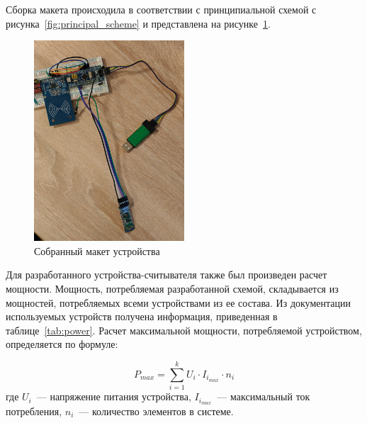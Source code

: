 Сборка макета происходила в соответствии с принципиальной схемой с рисунка~\ref{fig:principal_scheme} и представлена на рисунке~\ref{fig:maket}.

\begin{figure}[H]
    \centering
    \includegraphics[width=0.5\textwidth]{images/design/maket}
    \caption{\centering Собранный макет устройства}
    \label{fig:maket}
\end{figure}

Для разработанного устройства-считывателя также был произведен расчет мощности.
Мощность, потребляемая разработанной схемой, складывается из мощностей, потребляемых всеми устройствами из ее состава.
Из документации используемых устройств получена информация, приведенная в таблице~\ref{tab:power}.
Расчет максимальной мощности, потребляемой устройством, определяется по формуле:

$$
P_{max} = \sum_{i=1}^{k} U_i \cdot I_{i_{max}} \cdot n_i
$$
где $U_i$~--- напряжение питания устройства, $I_{i_{max}}$~--- максимальный ток потребления, $n_i$~--- количество элементов в системе.

